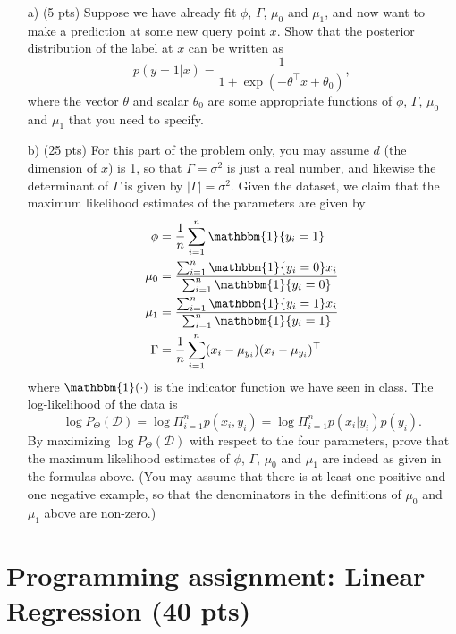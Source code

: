 \documentclass[12pt]{article}
\begin{document}
\begin{enumerate}
    \item[a)] (5 pts) Suppose we have already fit $\phi$, $\Gamma$, $\mu_0$ and $\mu_1$, and now want to make a prediction at some new query point $x$. Show that the posterior distribution of the label at $x$ can be written as $$p(y = 1|x)=\frac{1}{1 + \exp(-\theta^\top x+\theta_0)},$$
    where the vector $\theta$ and scalar $\theta_0$ are some appropriate functions of $\phi$, $\Gamma$, $\mu_0$ and $\mu_1$ that you need to specify.
    \item[b)] (25 pts) For this part of the problem only, you may assume $d$ (the dimension of $x$)
    is 1, so that $\Gamma=\sigma^2$ is just a real number, and likewise the determinant of $\Gamma$ is given by $|\Gamma|=\sigma^2$. Given the dataset, we claim that the maximum likelihood estimates of the parameters are given by
    \begin{align*}
        \phi&=\frac{1}{n}\sum_{i=1}^n\mathbbm{1}\{y_i=1\}\\
        \mu_0&=\frac{\sum_{i=1}^n\mathbbm{1}\{y_i=0\}x_i}{\sum_{i=1}^n\mathbbm{1}\{y_i=0\}}\\
        \mu_1&=\frac{\sum_{i=1}^n\mathbbm{1}\{y_i=1\}x_i}{\sum_{i=1}^n\mathbbm{1}\{y_i=1\}}\\
        \Gamma &= \frac{1}{n}\sum_{i=1}^n(x_i-\mu_{y_i})(x_i-\mu_{y_i})^\top
    \end{align*}
    where $\mathbbm{1}(\cdot)$ is the indicator function we have seen in class. The log-likelihood of the data is $$\log P_\Theta(\mathcal{D})=\log\Pi_{i=1}^n p(x_i,y_i)=\log\Pi_{i=1}^n p(x_i|y_i)p(y_i).$$
    By maximizing $\log P_\Theta(\mathcal{D})$ with respect to the four parameters, prove that the maximum likelihood estimates of $\phi$, $\Gamma$, $\mu_0$ and $\mu_1$ are indeed as given in the formulas above. (You may assume that there is at least one positive and one negative example, so that the denominators in the definitions of $\mu_0$ and $\mu_1$ above are non-zero.)
\end{enumerate} 


\section{Programming assignment: Linear Regression (40 pts)}
\label{sec:s5}
\end{document}
